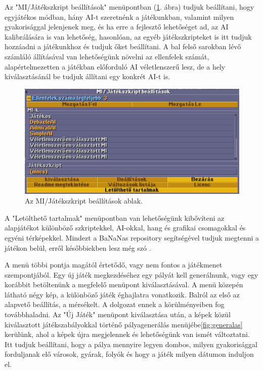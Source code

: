 Az "MI/Játékszkript beállítások" menüpontban (\ref{fig:mibeall}. ábra) tudjuk beállítani, hogy egyjátékos módban, hány AI-t szeretnénk a játékunkban, valamint milyen gyakorisággal jelenjenek meg, és ha erre a fejlesztő lehetőséget ad, az AI kalibrálására is van lehetőség, hasonlóan, az egyéb játékszkripteket is itt tudjuk hozzáadni a játékunkhoz és tudjuk őket beállítani. A bal felső sarokban lévő számláló állításával van lehetőségünk növelni az ellenfelek számát, alapértelmezetten a játékban előforduló AI véletlenszerű lesz, de a hely kiválasztásánál be tudjuk állítani egy konkrét AI-t is.

\begin{figure}[h!]
	\centering
	\includegraphics[scale=0.6]{images/mibeall.png}
	\caption{Az MI/Játékszkript beállítások ablak.}
	\label{fig:mibeall}
\end{figure}

A "Letölthető tartalmak" menüpontban van lehetőségünk kibővíteni az alapjátékot különböző szkriptekkel, AI-okkal, hang és grafikai csomagokkal és egyéni térképekkel. Mindezt a BaNaNas repository segítségével tudjuk megtenni a játékon belül, erről későbbiekben lesz még szó \cite{wisniewski2011artificial}. 

A menü többi pontja magától értetődő, vagy nem fontos a játékmenet szempontjából. Egy új játék megkezdéséhez egy pályát kell generálnunk, vagy egy korábbit betöltenünk a megfelelő menüpont kiválasztásával. A menü közepén látható négy kép, a különböző játék éghajlatra vonatkozik. Balról az első az alapvető beállítás, a mérsékelt. A dolgozat ennek a körülményeiben fog továbbhaladni. Az "Új Játék" menüpont kiválasztása után, a képek közül kiválasztott játékszabályokkal történő pályagenerálás menüjébe\ref{fig:generalas} kerülünk, ahol a képek újra megjelennek és lehetőségünk van ismét változtatni. Itt tudjuk beállítani, hogy a pálya mennyire legyen dombos, milyen gyakorisággal forduljanak elő városok, gyárak, folyók és hogy a játék milyen dátumon induljon el.

